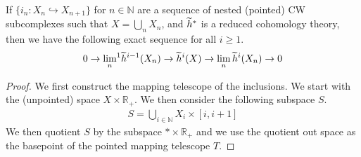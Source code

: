 \begin{thm} \label{thm-milnor} If $\{ i_n : X_n \hookrightarrow X_{n+1} \}$
  for $n \in \mathbb{N}$ are a sequence of nested (pointed) CW subcomplexes such that
  $X = \bigcup_n X_n$, and $\widetilde{h}^{\ast}$ is a reduced cohomology theory, then we have the
  following exact sequence for all $i \geq 1$.
  \begin{align*}
    0 \rightarrow {\lim_{n}}^1 \widetilde{h}^{i-1}(X_n) \rightarrow \widetilde{h}^i(X) \rightarrow \lim_n \widetilde{h}^i(X_n) \rightarrow 0
  \end{align*}
\end{thm}

\begin{proof}
  We first construct the mapping telescope of the inclusions. We start with the (unpointed) space
  $X \times \mathbb{R}_+$.  We then consider the following subspace $S$.
  \begin{align*}
    S = \bigcup_{i \in \mathbb{N}} X_i \times [i,i+1]
  \end{align*}
  We then quotient $S$ by the subspace ${\ast} \times \mathbb{R}_+$ and we use the quotient out
  space as the basepoint of the pointed mapping telescope $T$.


\end{proof}
